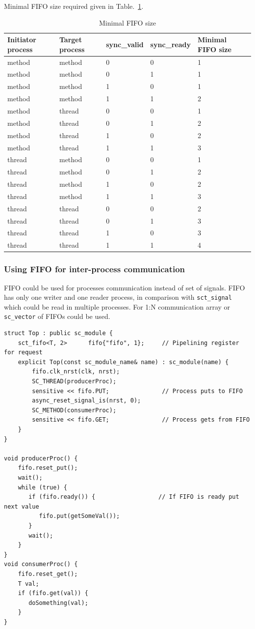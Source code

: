 Minimal FIFO size required given in Table.~\ref{tab:fifo_size}.
\begin{table}
\begin{tabular}{|l|l|l|l|l|}
\hline
Initiator process & Target process & sync\_valid & sync\_ready & Minimal FIFO size \\
\hline
method & method & 0 & 0 & 1 \\
method & method & 0 & 1 & 1 \\
method & method & 1 & 0 & 1 \\
method & method & 1 & 1 & 2 \\
method & thread & 0 & 0 & 1 \\
method & thread & 0 & 1 & 2 \\
method & thread & 1 & 0 & 2 \\
method & thread & 1 & 1 & 3 \\
thread & method & 0 & 0 & 1 \\
thread & method & 0 & 1 & 2 \\
thread & method & 1 & 0 & 2 \\
thread & method & 1 & 1 & 3 \\
thread & thread & 0 & 0 & 2 \\
thread & thread & 0 & 1 & 3 \\
thread & thread & 1 & 0 & 3 \\
thread & thread & 1 & 1 & 4 \\
\hline
\end{tabular}
\caption{Minimal FIFO size}
\label{tab:fifo_size}
\end{table}

\subsubsection{Using FIFO for inter-process communication}

FIFO could be used for processes communication instead of set of signals. FIFO has only one writer and one reader process, in comparison with {\tt sct\_signal} which could be read in multiple processes. For 1:N communication array or {\tt sc\_vector} of FIFOs could be used.

\begin{lstlisting}[style=mycpp]
struct Top : public sc_module {
    sct_fifo<T, 2>      fifo{"fifo", 1};     // Pipelining register for request
    explicit Top(const sc_module_name& name) : sc_module(name) {
        fifo.clk_nrst(clk, nrst);
        SC_THREAD(producerProc); 
        sensitive << fifo.PUT;               // Process puts to FIFO
        async_reset_signal_is(nrst, 0);
        SC_METHOD(consumerProc); 
        sensitive << fifo.GET;               // Process gets from FIFO   
    } 
}

void producerProc() {
    fifo.reset_put();
    wait();
    while (true) {
       if (fifo.ready()) {                  // If FIFO is ready put next value
          fifo.put(getSomeVal());
       }
       wait();
    }
}
void consumerProc() {
    fifo.reset_get();
    T val;
    if (fifo.get(val)) {
       doSomething(val);
    }
}
\end{lstlisting}

